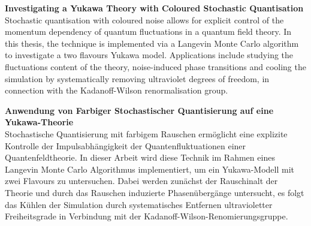 \documentclass[
11pt, %
english, %
singlespacing, %
headsepline, %
]{MastersDoctoralThesis} %
\author{John \textsc{Smith}} %
\begin{document}
\frontmatter %

\pagestyle{plain} %


\pagestyle{plain} %
\vspace*{\fill}
\noindent\textbf{\large Investigating a Yukawa Theory with Coloured Stochastic Quantisation}
\vspace{20pt}\\
Stochastic quantisation with coloured noise allows for explicit control of the momentum dependency of 
quantum fluctuations in a quantum field theory.
In this thesis, the technique is implemented via a Langevin Monte Carlo algorithm to investigate a two flavours Yukawa model.
Applications include studying the fluctuations content of the theory, noise-induced phase transitions and 
cooling the simulation by systematically removing ultraviolet degrees of freedom, in connection with the Kadanoff-Wilson renormalisation group. \par
\vspace*{\fill}
\noindent\textbf{\large Anwendung von Farbiger Stochastischer Quantisierung auf eine Yukawa-Theorie}
\vspace{20pt}\\
Stochastische Quantisierung mit farbigem Rauschen ermöglicht eine explizite Kontrolle der Impulsabhängigkeit der Quantenfluktuationen einer Quantenfeldtheorie. 
In dieser Arbeit wird diese Technik im Rahmen eines Langevin Monte Carlo Algorithmus implementiert, um ein Yukawa-Modell mit zwei Flavours zu untersuchen. 
Dabei werden zunächst der Rauschinalt der Theorie und durch das Rauschen induzierte Phasenübergänge untersucht, es folgt das Kühlen der Simulation durch systematisches Entfernen ultravioletter Freiheitsgrade in Verbindung mit der Kadanoff-Wilson-Renomierungsgruppe.
\vspace*{\fill}
\cleardoublepage

{
    \hypersetup{linkcolor=black}
    \tableofcontents
}
\end{document}
